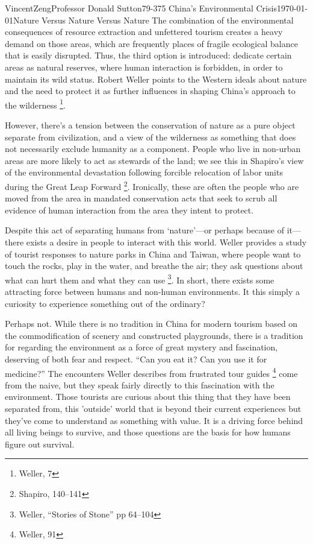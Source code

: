 \documentclass[12pt]{article}
\begin{document}
\begin{mla}{Vincent}{Zeng}{Professor Donald Sutton}{79-375 China's Environmental Crisis}{\today}{Nature Versus Nature Versus Nature}
The combination of the environmental consequences of resource extraction and
unfettered tourism creates a heavy demand on those areas, which are frequently
places of fragile ecological balance that is easily disrupted. Thus, the third
option is introduced: dedicate certain areas as natural reserves, where human
interaction is forbidden, in order to maintain its wild status. Robert Weller
points to the Western ideals about nature and the need to protect it as further
influences in shaping China's approach to the wilderness \footnote{Weller, 7}.

However, there's a tension between the conservation of nature as a pure object separate
from civilization, and a view of the wilderness as something that does not
necessarily exclude humanity as a component. People who live in non-urban areas
are more likely to act as stewards of the land; we see this in Shapiro's view
of the environmental devastation following forcible relocation of labor units
during the Great Leap Forward \footnote{Shapiro, 140--141}.  Ironically, these
are often the people who are moved from the area in mandated conservation acts
that seek to scrub all evidence of human interaction from the area they intent
to protect. 

Despite this act of separating humans from `nature'---or perhaps because of
it---there exists a desire in people to interact with this world. Weller
provides a study of tourist responses to nature parks in China and Taiwan, where
people want to touch the rocks, play in the water, and breathe the air; they
ask questions about what can hurt them and what they can use \footnote{Weller,
``Stories of Stone'' pp 64--104}. In short, there exists some attracting force between
humans and non-human environments. It this simply a curiosity to experience
something out of the ordinary?

Perhaps not. While there is no tradition in China for modern tourism based on
the commodification of scenery and constructed playgrounds, there is a
tradition for regarding the environment as a force of great mystery and
fascination, deserving of both fear and respect. ``Can you eat it? Can you use
it for medicine?'' The encounters Weller describes from frustrated tour guides
\footnote{Weller, 91} come from the naive, but they speak fairly directly to
this fascination with the environment. Those tourists are curious about this
thing that they have been separated from, this 'outside' world that is beyond
their current experiences but they've come to understand as something with
value. It is a driving force behind all living beings to survive, and those
questions are the basis for how humans figure out survival.


\end{mla}
\end{document}
